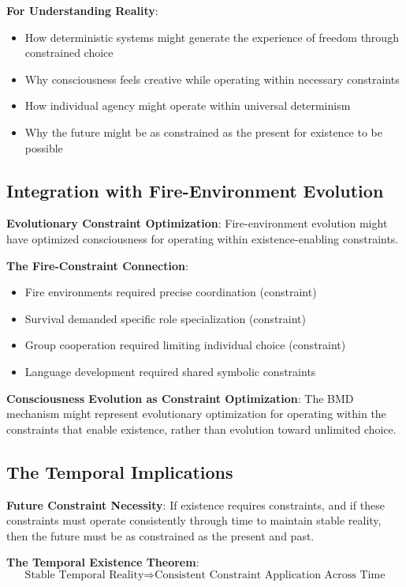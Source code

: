 \documentclass[12pt]{article}
\begin{document}
\textbf{For Understanding Reality}:
\begin{itemize}
\item How deterministic systems might generate the experience of freedom through constrained choice
\item Why consciousness feels creative while operating within necessary constraints
\item How individual agency might operate within universal determinism
\item Why the future might be as constrained as the present for existence to be possible
\end{itemize}

\subsection{Integration with Fire-Environment Evolution}

\textbf{Evolutionary Constraint Optimization}: Fire-environment evolution might have optimized consciousness for operating within existence-enabling constraints.

\textbf{The Fire-Constraint Connection}:
\begin{itemize}
\item Fire environments required precise coordination (constraint)
\item Survival demanded specific role specialization (constraint)
\item Group cooperation required limiting individual choice (constraint)
\item Language development required shared symbolic constraints
\end{itemize}

\textbf{Consciousness Evolution as Constraint Optimization}: The BMD mechanism might represent evolutionary optimization for operating within the constraints that enable existence, rather than evolution toward unlimited choice.

\subsection{The Temporal Implications}

\textbf{Future Constraint Necessity}: If existence requires constraints, and if these constraints must operate consistently through time to maintain stable reality, then the future must be as constrained as the present and past.

\textbf{The Temporal Existence Theorem}:
$$\text{Stable Temporal Reality} \Rightarrow \text{Consistent Constraint Application Across Time}$$
\end{document}
